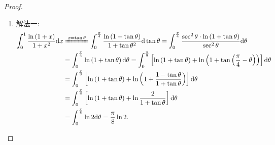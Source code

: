 \documentclass[../../main.tex]{subfiles}%
\begin{document}
\begin{proof}
\begin{enumerate}
\item {\color{blue}解法一:}
\begin{align*}
\int_0^1{\frac{\ln \left( 1+x \right)}{1+x^2}\mathrm{d}x}&\xlongequal{x=\tan \theta}\int_0^{\frac{\pi}{4}}{\frac{\ln \left( 1+\tan \theta \right)}{1+\tan \theta ^2}\mathrm{d}\tan \theta}=\int_0^{\frac{\pi}{4}}{\frac{\sec ^2\theta \cdot \ln \left( 1+\tan \theta \right)}{\sec ^2\theta}\mathrm{d}\theta}
\\
&=\int_0^{\frac{\pi}{4}}{\ln \left( 1+\tan \theta \right) \mathrm{d}\theta}=\int_0^{\frac{\pi}{8}}{\left[ \ln \left( 1+\tan \theta \right) +\ln \left( 1+\tan \left( \frac{\pi}{4}-\theta \right) \right) \right] \mathrm{d}\theta}
\\
&=\int_0^{\frac{\pi}{8}}{\left[ \ln \left( 1+\tan \theta \right) +\ln \left( 1+\frac{1-\tan \theta}{1+\tan \theta} \right) \right] \mathrm{d}\theta}
\\
&=\int_0^{\frac{\pi}{8}}{\left[ \ln \left( 1+\tan \theta \right) +\ln \frac{2}{1+\tan \theta} \right] \mathrm{d}\theta}
\\
&=\int_0^{\frac{\pi}{8}}{\ln 2\mathrm{d}\theta}=\frac{\pi}{8}\ln 2.
\end{align*} 


\end{enumerate}
\end{proof}
\end{document}
